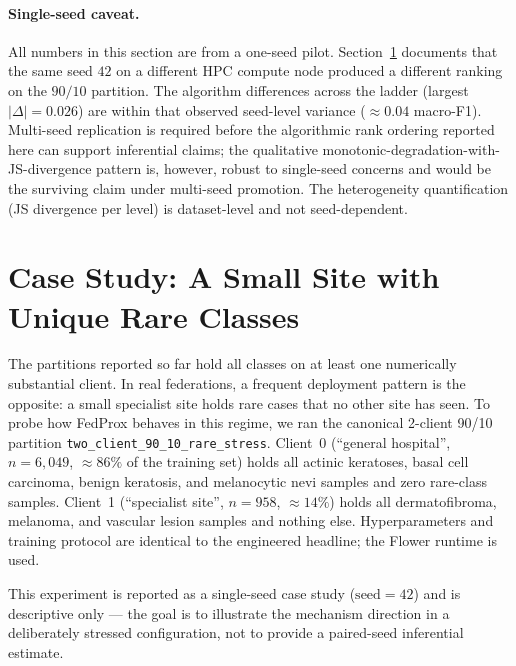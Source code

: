 \documentclass[11pt,a4paper]{report}
\begin{document}
\paragraph{Single-seed caveat.}
All numbers in this section are from a one-seed pilot. Section~\ref{sec:small-hospital}
documents that the same seed $42$ on a different HPC compute node
produced a different ranking on the $90/10$ partition. The
algorithm differences across the ladder (largest $|\Delta| =
0.026$) are within that observed seed-level variance ($\approx
0.04$ macro-F1). Multi-seed replication is required before the
algorithmic rank ordering reported here can support inferential
claims; the qualitative monotonic-degradation-with-JS-divergence
pattern is, however, robust to single-seed concerns and would be
the surviving claim under multi-seed promotion. The heterogeneity
quantification (JS divergence per level) is dataset-level and not
seed-dependent.

\section{Case Study: A Small Site with Unique Rare Classes}
\label{sec:small-hospital}

The partitions reported so far hold all classes on at least one
numerically substantial client. In real federations, a frequent
deployment pattern is the opposite: a small specialist site holds
rare cases that no other site has seen. To probe how FedProx behaves
in this regime, we ran the canonical 2-client 90/10 partition
\texttt{two\_client\_90\_10\_rare\_stress}. Client~0 (``general
hospital'', $n = 6{,}049$, $\approx 86\%$ of the training set) holds
all actinic keratoses, basal cell carcinoma, benign keratosis, and
melanocytic nevi samples and zero rare-class samples. Client~1
(``specialist site'', $n = 958$, $\approx 14\%$) holds all
dermatofibroma, melanoma, and vascular lesion samples and nothing
else. Hyperparameters and training protocol are identical to the
engineered headline; the Flower runtime is used.

This experiment is reported as a single-seed case study
($\text{seed} = 42$) and is descriptive only --- the goal is to
illustrate the mechanism direction in a deliberately stressed
configuration, not to provide a paired-seed inferential estimate.
\end{document}
